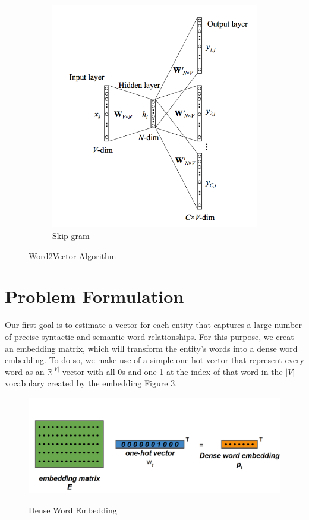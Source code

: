 \documentclass[]{article}
\begin{document}
\begin{figure}
\begin{subfigure}{.5\textwidth}
			\includegraphics[width=.8\linewidth]{Figures/Skip}
			\caption{Skip-gram}
			\label{fig:sfig2}
		\end{subfigure}
		\caption{Word2Vector Algorithm}
		\label{fig:fig}
	\end{figure}
	
	\section{Problem Formulation}
	Our first goal is to estimate a vector for each entity that captures a large number of precise syntactic and semantic word relationships. For this purpose, we creat an embedding matrix, which will transform the entity's words into a dense word embedding.  To do so, we make use of a simple one-hot vector that represent every word as an $\mathbb{R}^{|V|}$ vector with all 0s and one 1 at the index of that word in the $|V|$ vocabulary created by the embedding Figure \ref{fig:DE}.
	
	\begin{figure}[h]
		\caption{Dense Word Embedding}
		\centering
		\includegraphics[width=1\textwidth]{Figures/Embeddings}
		\label{fig:DE}
	\end{figure}
	
\end{document}

